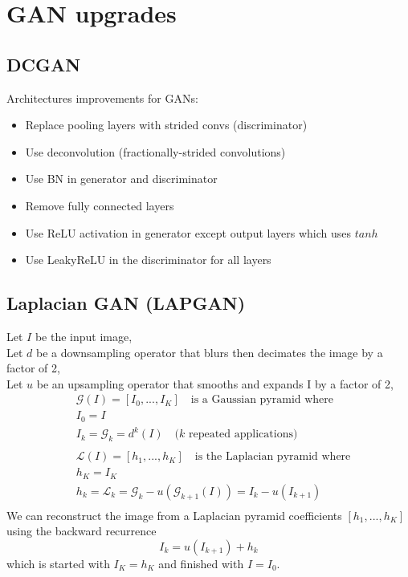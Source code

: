 \documentclass[../main.tex]{subfiles}
\begin{document}
\section{GAN upgrades}
\subsection{DCGAN}
Architectures improvements for GANs:
\begin{itemize}
    \item Replace pooling layers with strided convs (discriminator)
    \item Use deconvolution (fractionally-strided convolutions)
    \item Use BN in generator and discriminator
    \item Remove fully connected layers
    \item Use ReLU activation in generator except output layers which uses $tanh$
    \item Use LeakyReLU in the discriminator for all layers
\end{itemize}

\subsection{Laplacian GAN (LAPGAN)}
Let $I$ be the input image,\\
Let $d$ be a downsampling operator that blurs then decimates the image by a factor of 2, \\
Let $u$ be an upsampling operator that smooths and expands I by a factor of 2, \\
\begin{align*}
    &\mathcal{G}(I) = [I_0, ..., I_K]  \quad \text{is a Gaussian pyramid where} \\
    &I_0 = I \\
    &I_k = \mathcal{G}_k = d^k(I) \quad \text{($k$ repeated applications)}\\
    \\
    &\mathcal{L}(I) = [h_1, ..., h_K]  \quad \text{is the Laplacian pyramid where} \\
    &h_K = I_K \\
    &h_k = \mathcal{L}_k = \mathcal{G}_k - u(\mathcal{G}_{k+1}(I)) = I_k - u(I_{k+1}) \\
\end{align*}
We can reconstruct the image from a Laplacian pyramid coefficients $[h_1, ..., h_K]$ using
the backward recurrence
\begin{equation}
    I_k = u(I_{k+1}) + h_k
\end{equation}
which is started with $I_K = h_K$ and finished with $I = I_0$.
\end{document}
